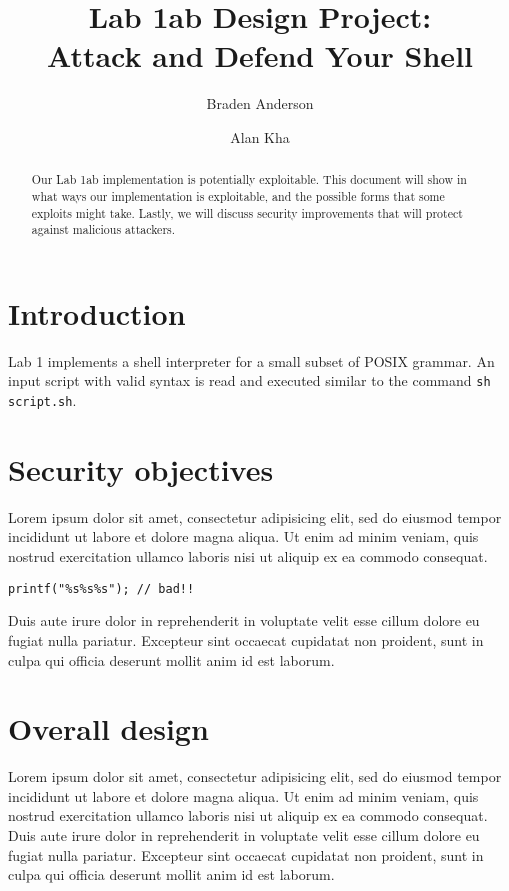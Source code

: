 \documentclass[12pt]{article}
\begin{document}
\lstset{language=C}

\title{Lab 1ab Design Project:\\ Attack and Defend Your Shell}
\author[1]{Braden Anderson}
\author[2]{Alan Kha}

\maketitle

\begin{abstract}
Our Lab 1ab implementation is potentially exploitable. This document will show in what ways our implementation is exploitable, and the possible forms that some exploits might take. Lastly, we will discuss security improvements that will protect against malicious attackers.
\end{abstract}

\section{Introduction}
Lab 1 implements a shell interpreter for a small subset of POSIX grammar. An input script with valid syntax is read and executed similar to the command \texttt{sh script.sh}.

\section{Security objectives}
Lorem ipsum dolor sit amet, consectetur adipisicing elit, sed do eiusmod tempor incididunt ut labore et dolore magna aliqua. Ut enim ad minim veniam, quis nostrud exercitation ullamco laboris nisi ut aliquip ex ea commodo consequat. 
\begin{lstlisting}[frame=single]
printf("%s%s%s"); // bad!!
\end{lstlisting}
Duis aute irure dolor in reprehenderit in voluptate velit esse cillum dolore eu fugiat nulla pariatur. Excepteur sint occaecat cupidatat non proident, sunt in culpa qui officia deserunt mollit anim id est laborum.

\section{Overall design}
Lorem ipsum dolor sit amet, consectetur adipisicing elit, sed do eiusmod tempor incididunt ut labore et dolore magna aliqua. Ut enim ad minim veniam, quis nostrud exercitation ullamco laboris nisi ut aliquip ex ea commodo consequat. Duis aute irure dolor in reprehenderit in voluptate velit esse cillum dolore eu fugiat nulla pariatur. Excepteur sint occaecat cupidatat non proident, sunt in culpa qui officia deserunt mollit anim id est laborum.
\end{document}
